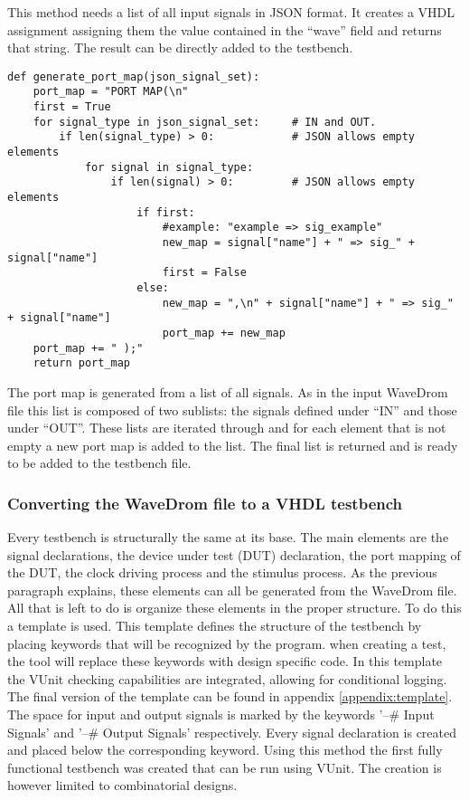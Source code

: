 This method needs a list of all input signals in JSON format. It creates a VHDL assignment assigning them the value contained in the “wave” field and returns that string. The result can be directly added to the testbench.\newpage
\begin{lstlisting}[style=python, caption={Generating a port map in Python}, label={
python:port_map}]
def generate_port_map(json_signal_set):
	port_map = "PORT MAP(\n"
	first = True
	for signal_type in json_signal_set:     # IN and OUT.
		if len(signal_type) > 0:            # JSON allows empty elements
			for signal in signal_type:
				if len(signal) > 0:         # JSON allows empty elements
					if first:
						#example: "example => sig_example"
						new_map = signal["name"] + " => sig_" + signal["name"]
						first = False
					else:
						new_map = ",\n" + signal["name"] + " => sig_" + signal["name"]
						port_map += new_map
	port_map += " );"
	return port_map
\end{lstlisting}\noindent
The port map is generated from a list of all signals. As in the input WaveDrom file this list is composed of two sublists: the signals defined under “IN” and those under “OUT”. These lists are iterated through and for each element that is not empty a new port map is added to the list. The final list is returned and is ready to be added to the testbench file.
\subsubsection{Converting the WaveDrom file to a VHDL testbench}
Every testbench is structurally the same at its base. The main elements are the signal declarations, the device under test (DUT) declaration, the port mapping of the DUT, the clock driving process and the stimulus process. As the previous paragraph explains, these elements can all be generated from the WaveDrom file. All that is left to do is organize these elements in the proper structure. To do this a template is used. This template defines the structure of the testbench by placing keywords that will be recognized by the program. when creating a test, the tool will replace these keywords with design specific code. In this template the VUnit checking capabilities are integrated, allowing for conditional logging. The final version of the template can be found in appendix \ref{appendix:template}.
\newpage\noindent
The space for input and output signals is marked by the keywords '--\# Input Signals' and '--\# Output Signals' respectively. Every signal declaration is created and placed below the corresponding keyword. 
\npar
Using this method the first fully functional testbench was created that can be run using VUnit. The creation is however limited to combinatorial designs.
